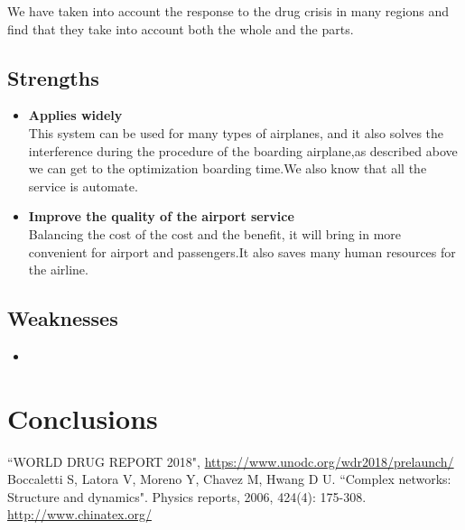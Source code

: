 \documentclass{mcmthesis}
\begin{document}
We have taken into account the response to the drug crisis in many regions and find that they take into account both the whole and the parts.

\subsection{Strengths}
\begin{itemize}
	\item \textbf{Applies widely}\\
	This  system can be used for many types of airplanes, and it also
	solves the interference during  the procedure of the boarding
	airplane,as described above we can get to the  optimization
	boarding time.We also know that all the service is automate.
	\item \textbf{Improve the quality of the airport service}\\
	Balancing the cost of the cost and the benefit, it will bring in
	more convenient  for airport and passengers.It also saves many
	human resources for the airline.
\end{itemize}

\subsection{Weaknesses}
\begin{itemize}
	\item
\end{itemize}

\section{Conclusions}


\begin{thebibliography}{99}
	 ``WORLD DRUG REPORT 2018", \url{https://www.unodc.org/wdr2018/prelaunch/}
	 Boccaletti S, Latora V, Moreno Y, Chavez M, Hwang D U. ``Complex networks: Structure and dynamics". Physics reports, 2006, 424(4): 175-308.
	\url{http://www.chinatex.org/}
\end{thebibliography}
\end{document}

